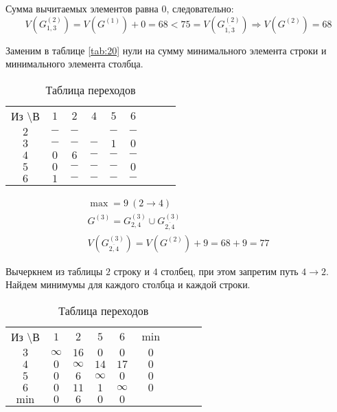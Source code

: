 Сумма вычитаемых элементов равна $0$, следовательно:
\begin{equation*}
V(G_{1,3}^{(2)}) = V(G^{(1)}) + 0 = 68 < 75 = V(G_{\overline{1,3}}^{(2)}) \Rightarrow V(G^{(2)}) = 68
\end{equation*}

Заменим в таблице \ref{tab:20} нули на сумму минимального элемента строки и минимального элемента столбца.

\begin{table}[H]
\begin{center}
	\def\tabcolsep{15pt}
	\caption{Таблица переходов}
	\label{tab:22}
	\begin{tabular}{|c||c|c|c|c|c|c|c|c|}
		\hline
		Из \textbackslash В & $1$ & $2$ & $4$ & $5$ & $6$ \\
		\hhline{|=#=|=|=|=|=|=|}
		\hline
		$2$ & $-$ & $-$ & \redbold{$9$} & $-$ & $-$ \\
		\hline
		$3$ & $-$ & $-$ & $-$ & $1$ & $0$ \\ 
		\hline
		$4$ & $0$ & $6$ & $-$ & $-$ & $-$ \\
		\hline
		$5$ & $0$ & $-$ & $-$ & $-$ & $0$ \\
		\hline
		$6$ & $1$ & $-$ & $-$ & $-$ & $-$ \\
		\hline 
	\end{tabular}
\end{center}
\end{table}

\vspace{-1cm}
\begin{gather*}
\max = 9\ (2 \rightarrow 4) \\
G^{(3)} = G_{2,4}^{(3)} \cup G_{\overline{2,4}}^{(3)} \\
V(G_{\overline{2,4}}^{(3)}) = V(G^{(2)}) + 9 = 68 + 9 = 77
\end{gather*}

Вычеркнем из таблицы $2$ строку и $4$ столбец, при этом запретим путь $4 \rightarrow 2$. Найдем минимумы для каждого столбца и каждой строки.

\begin{table}[H]
\begin{center}
	\def\tabcolsep{15pt}
	\caption{Таблица переходов}
	\label{tab:23}
	\begin{tabular}{|c||c|c|c|c|c|c|c|c|}
		\hline
		Из \textbackslash В & $1$ & $2$ & $5$ & $6$ & $\min$ \\
		\hhline{|=#=|=|=|=|=|=|}
		\hline
		$3$ & $\infty$ & $16$ & $0$ & $0$ & $0$  \\ 
		\hline
		$4$ & $0$ & $\infty$ & $14$ & $17$ & $0$  \\
		\hline
		$5$ & $0$ & $6$ & $\infty$ & $0$ & $0$  \\
		\hline
		$6$ & $0$ & $11$ & $1$ & $\infty$ & $0$  \\ 
		\hhline{|=#=|=|=|=|=|=|}
		$\min$ & $0$ & $6$ & $0$ & $0$ & \\
		\hline 
	\end{tabular}
\end{center}
\end{table}

